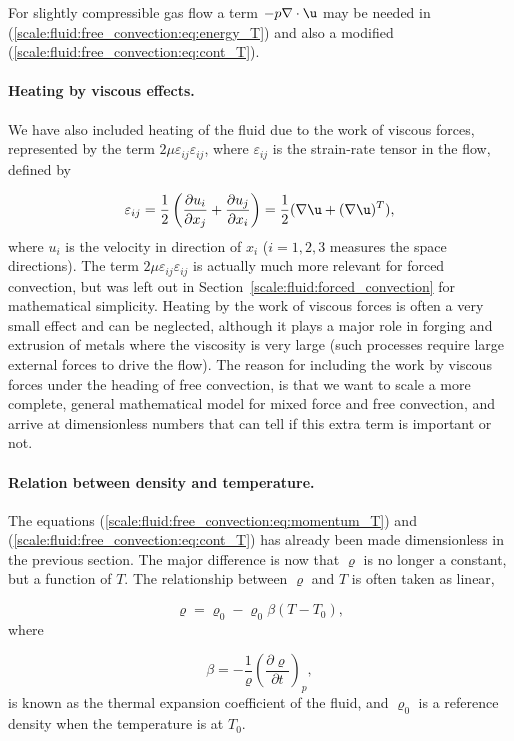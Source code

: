 \documentclass[graybox,envcountchap,sectrefs,final]{svmonodo}
\begin{document}
For slightly compressible gas flow a term $-p\nabla\cdot\u$ may be
needed in (\ref{scale:fluid:free_convection:eq:energy_T}) and also
a modified (\ref{scale:fluid:free_convection:eq:cont_T}).

\paragraph{Heating by viscous effects.}
We have also included heating of the fluid due to the work of viscous forces,
represented by the term $2\mu\varepsilon_{ij}\varepsilon_{ij}$, where
$\varepsilon_{ij}$ is the strain-rate tensor in the flow, defined by

\[ \varepsilon_{ij} = \frac{1}{2}\left(\frac{\partial u_i}{\partial x_j}
+ \frac{\partial u_j}{\partial x_i}\right) = \frac{1}{2}(\nabla\u + (\nabla\u)^T),\]
where $u_i$ is the velocity in direction of $x_i$ ($i=1,2,3$ measures
the space directions). The term $2\mu\varepsilon_{ij}\varepsilon_{ij}$
is actually much
more relevant for forced convection, but was left out in Section~\ref{scale:fluid:forced_convection} for mathematical simplicity.
Heating by the work of viscous forces is often a very small effect and
can be neglected, although it plays a major role in forging and
extrusion of metals where the viscosity is very large (such
processes require large external forces to drive the flow).  The reason
for including the work by viscous forces under the heading
of free convection, is that we want to scale a more complete,
general mathematical model for mixed force and free convection, and
arrive at dimensionless numbers that can tell if this extra term is
important or not.

\paragraph{Relation between density and temperature.}
The equations (\ref{scale:fluid:free_convection:eq:momentum_T}) and
(\ref{scale:fluid:free_convection:eq:cont_T}) has already been made dimensionless
in the previous section. The major difference is now that $\varrho$
is no longer a constant, but a function of $T$.
The relationship between $\varrho$ and $T$ is often taken as
linear,

\[ \varrho = \varrho_0 -\varrho_0 \beta (T-T_0),\]
where

\[ \beta = -\frac{1}{\varrho}\left(\frac{\partial\varrho}{\partial t}
\right)_p,\]
is known as the thermal expansion coefficient of the fluid,
and $\varrho_0$ is a reference density when the temperature is at $T_0$.
\end{document}
